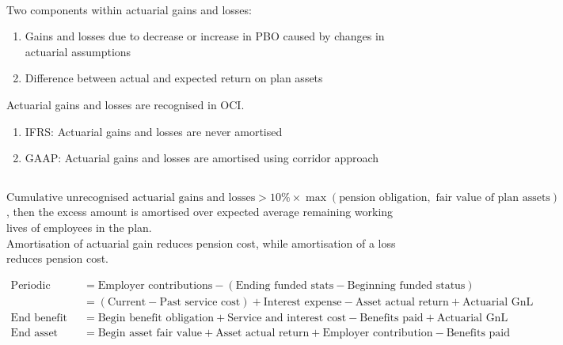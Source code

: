 \begin{definition} \\
Two components within actuarial gains and losses:
\begin{enumerate}[label=\roman*.]
\setlength{\itemsep}{0pt}
\item Gains and losses due to decrease or increase in PBO caused by changes in actuarial assumptions
\item Difference between actual and expected return on plan assets
\end{enumerate}
Actuarial gains and losses are recognised in OCI.
\begin{enumerate}[label=\roman*.]
\setlength{\itemsep}{0pt}
\item IFRS: Actuarial gains and losses are never amortised
\item GAAP: Actuarial gains and losses are amortised using corridor approach
\end{enumerate}
\end{definition}

\begin{method} \\
$\text{Cumulative unrecognised actuarial gains and losses} > 10\% \times \max(\text{pension obligation}, \text{ fair value of plan assets})$, then the excess amount is amortised over expected average remaining working lives of employees in the plan.\\
Amortisation of actuarial gain reduces pension cost, while amortisation of a loss reduces pension cost.
\end{method}

\begin{method} 
\begin{align}
\text{Periodic pension cost} &= \text{Employer contributions} - (\text{Ending funded stats} - \text{Beginning funded status}) \nonumber \\
&= (\text{Current} - \text{Past service cost}) + \text{Interest expense} - \text{Asset actual return} + \text{Actuarial GnL} \nonumber \\
\text{End benefit obligation} &= \text{Begin benefit obligation} + \text{Service and interest cost} - \text{Benefits paid} + \text{Actuarial GnL} \nonumber \\
\text{End asset fair value} &= \text{Begin asset fair value} + \text{Asset actual return} + \text{Employer contribution} - \text{Benefits paid} \nonumber
\end{align}
\end{method}

